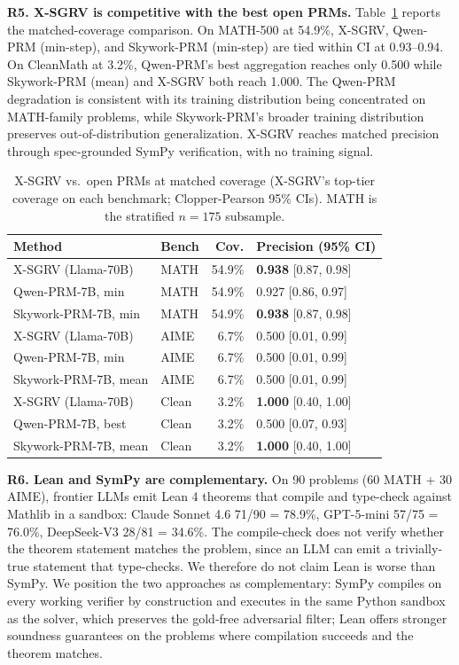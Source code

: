 \documentclass{article}
\begin{document}
\textbf{R5. X-SGRV is competitive with the best open PRMs.} Table~\ref{tab:prm} reports the matched-coverage comparison. On MATH-500 at 54.9\%, X-SGRV, Qwen-PRM (min-step), and Skywork-PRM (min-step) are tied within CI at 0.93--0.94. On CleanMath at 3.2\%, Qwen-PRM's best aggregation reaches only 0.500 while Skywork-PRM (mean) and X-SGRV both reach 1.000. The Qwen-PRM degradation is consistent with its training distribution being concentrated on MATH-family problems, while Skywork-PRM's broader training distribution preserves out-of-distribution generalization. X-SGRV reaches matched precision through spec-grounded SymPy verification, with no training signal.

\begin{table}[t]
\centering
\caption{X-SGRV vs.\ open PRMs at matched coverage (X-SGRV's top-tier coverage on each benchmark; Clopper-Pearson 95\% CIs). MATH is the stratified $n{=}175$ subsample.}
\label{tab:prm}
\footnotesize
\setlength{\tabcolsep}{3pt}
\begin{tabular}{@{}llrl@{}}
\toprule
Method & Bench & Cov. & Precision (95\% CI) \\
\midrule
X-SGRV (Llama-70B)   & MATH  & 54.9\% & \textbf{0.938} [0.87, 0.98] \\
Qwen-PRM-7B, min     & MATH  & 54.9\% & 0.927 [0.86, 0.97] \\
Skywork-PRM-7B, min  & MATH  & 54.9\% & \textbf{0.938} [0.87, 0.98] \\
\midrule
X-SGRV (Llama-70B)   & AIME  &  6.7\% & 0.500 [0.01, 0.99] \\
Qwen-PRM-7B, min     & AIME  &  6.7\% & 0.500 [0.01, 0.99] \\
Skywork-PRM-7B, mean & AIME  &  6.7\% & 0.500 [0.01, 0.99] \\
\midrule
X-SGRV (Llama-70B)   & Clean &  3.2\% & \textbf{1.000} [0.40, 1.00] \\
Qwen-PRM-7B, best    & Clean &  3.2\% & 0.500 [0.07, 0.93] \\
Skywork-PRM-7B, mean & Clean &  3.2\% & \textbf{1.000} [0.40, 1.00] \\
\bottomrule
\end{tabular}
\end{table}

\textbf{R6. Lean and SymPy are complementary.} On 90 problems (60 MATH + 30 AIME), frontier LLMs emit Lean 4 theorems that compile and type-check against Mathlib in a sandbox: Claude Sonnet 4.6 71/90 = 78.9\%, GPT-5-mini 57/75 = 76.0\%, DeepSeek-V3 28/81 = 34.6\%. The compile-check does not verify whether the theorem statement matches the problem, since an LLM can emit a trivially-true statement that type-checks. We therefore do not claim Lean is worse than SymPy. We position the two approaches as complementary: SymPy compiles on every working verifier by construction and executes in the same Python sandbox as the solver, which preserves the gold-free adversarial filter; Lean offers stronger soundness guarantees on the problems where compilation succeeds and the theorem matches.
\end{document}

